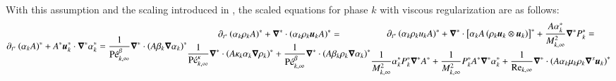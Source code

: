 \documentclass[preprint,10pt]{elsarticle}
\begin{document}
{%
With this assumption and the scaling introduced in , the scaled equations for phase $k$ with viscous regularization are as follows:
% 
\begin{subequations}\label{eq:sev_equ_case_one_scaled}
%
\begin{align}\label{eq:sev_equ-with-diss-terms-vf_case_one_scaled}
\partial_{t^*} \left( \alpha_k  A\right)^* + A^* \mbold u_k^* \cdot \grad^* \alpha_k^* =  \frac{1}{\Pe_{k,\infty}^\beta} \grad^* \cdot \left( A \beta_k \grad \alpha_k \right)^*
\end{align}
%
\begin{multline}\label{eq:sev_equ-with-diss-terms-cont_case_one_scaled}
\partial_{t^*} \left( \alpha_k \rho_k A \right)^* + \grad^* \cdot \left( \alpha_k \rho_k \mbold u_k A \right)^* = \\ \frac{1}{\Pe^\kappa_{k,\infty}}\grad^* \cdot \left(A \kappa_k \alpha_k \grad \rho_k \right)^* +
\frac{1}{\Pe_{k,\infty}^\beta} \grad^* \cdot \left( A \beta_k \rho_k \grad \alpha_k \right)^*
\end{multline}
%
\begin{multline}\label{eq:sev_equ-with-diss-terms-mom_case_one_scaled}
\partial_{t^*} \left( \alpha_k \rho_k u_k A \right)^* + \grad^* \cdot \left[ \alpha_k A \left( \rho_k \mbold u_k \otimes \mbold u_k\right)\right]^* + \frac{A \alpha_k^*}{M^2_{k,\infty}}\grad^* P_k^* = \\
  \frac{1}{M^2_{k,\infty}} \alpha_k^* P^*_k \grad^* A^* 
+ \frac{1}{M^2_{k,\infty}} P_k^* A^* \grad^* \alpha_k^* 
+ \frac{1}{\Re_{k,\infty}}\grad^* \cdot \left( A \alpha_k \mu_k \rho_k \grad^s \mbold u_k \right)^* \\ 

\end{multline}
\end{subequations}}
\end{document}
